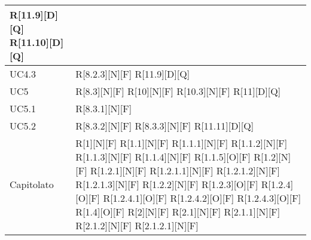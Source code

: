 \begin{longtable}{X | X}
		R[11.9][D][Q] \newline
		R[11.10][D][Q] \\
		\hline
		UC4.3 &
		R[8.2.3][N][F] \newline
		R[11.9][D][Q] \\
		\hline
		UC5 & 
		R[8.3][N][F] \newline
		R[10][N][F] \newline
		R[10.3][N][F] \newline
		R[11][D][Q] \\
		\hline
		UC5.1 & 
		R[8.3.1][N][F] \\
		\hline
		UC5.2 & 
		R[8.3.2][N][F] \newline
		R[8.3.3][N][F] \newline
		R[11.11][D][Q] \\
		\hline
		Capitolato & 
		R[1][N][F]			 \newline    
		R[1.1][N][F]           \newline
		R[1.1.1][N][F]         \newline
		R[1.1.2][N][F]         \newline
		R[1.1.3][N][F]         \newline
		R[1.1.4][N][F]         \newline
		R[1.1.5][O][F]         \newline
		R[1.2][N][F]           \newline
		R[1.2.1][N][F]         \newline
		R[1.2.1.1][N][F]       \newline
		R[1.2.1.2][N][F]       \newline
		R[1.2.1.3][N][F]       \newline
		R[1.2.2][N][F]         \newline
		R[1.2.3][O][F]         \newline
		R[1.2.4][O][F]         \newline
		R[1.2.4.1][O][F]       \newline
		R[1.2.4.2][O][F]       \newline
		R[1.2.4.3][O][F]       \newline
		R[1.4][O][F]           \newline
		R[2][N][F]             \newline
		R[2.1][N][F]	         \newline
		R[2.1.1][N][F]         \newline
		R[2.1.2][N][F]         \newline
		R[2.1.2.1][N][F]       \newline

\end{longtable}
